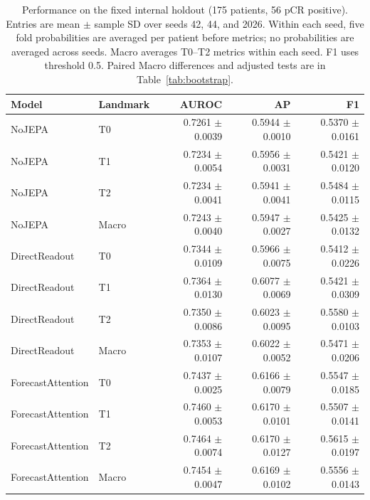 \begin{table}[t]
\centering
\small
\caption{Performance on the fixed internal holdout (175 patients, 56 pCR positive). Entries are mean $\pm$ sample SD over seeds 42, 44, and 2026. Within each seed, five fold probabilities are averaged per patient before metrics; no probabilities are averaged across seeds. Macro averages T0--T2 metrics within each seed. F1 uses threshold 0.5. Paired Macro differences and adjusted tests are in Table~\ref{tab:bootstrap}.}
\label{tab:main}
\begin{tabular}{llrrr}
\toprule
Model & Landmark & AUROC & AP & F1 \\
\midrule
NoJEPA & T0 & 0.7261 $\pm$ 0.0039 & 0.5944 $\pm$ 0.0010 & 0.5370 $\pm$ 0.0161 \\
NoJEPA & T1 & 0.7234 $\pm$ 0.0054 & 0.5956 $\pm$ 0.0031 & 0.5421 $\pm$ 0.0120 \\
NoJEPA & T2 & 0.7234 $\pm$ 0.0041 & 0.5941 $\pm$ 0.0041 & 0.5484 $\pm$ 0.0115 \\
NoJEPA & Macro & 0.7243 $\pm$ 0.0040 & 0.5947 $\pm$ 0.0027 & 0.5425 $\pm$ 0.0132 \\
DirectReadout & T0 & 0.7344 $\pm$ 0.0109 & 0.5966 $\pm$ 0.0075 & 0.5412 $\pm$ 0.0226 \\
DirectReadout & T1 & 0.7364 $\pm$ 0.0130 & 0.6077 $\pm$ 0.0069 & 0.5421 $\pm$ 0.0309 \\
DirectReadout & T2 & 0.7350 $\pm$ 0.0086 & 0.6023 $\pm$ 0.0095 & 0.5580 $\pm$ 0.0103 \\
DirectReadout & Macro & 0.7353 $\pm$ 0.0107 & 0.6022 $\pm$ 0.0052 & 0.5471 $\pm$ 0.0206 \\
ForecastAttention & T0 & 0.7437 $\pm$ 0.0025 & 0.6166 $\pm$ 0.0079 & 0.5547 $\pm$ 0.0185 \\
ForecastAttention & T1 & 0.7460 $\pm$ 0.0053 & 0.6170 $\pm$ 0.0101 & 0.5507 $\pm$ 0.0141 \\
ForecastAttention & T2 & 0.7464 $\pm$ 0.0074 & 0.6170 $\pm$ 0.0127 & 0.5615 $\pm$ 0.0197 \\
ForecastAttention & Macro & 0.7454 $\pm$ 0.0047 & 0.6169 $\pm$ 0.0102 & 0.5556 $\pm$ 0.0143 \\
\bottomrule
\end{tabular}
\end{table}

